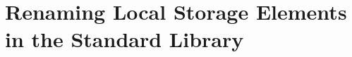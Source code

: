\FormallyParagraph
\begin{mathpar}
\end{mathpar}


\section{Renaming Local Storage Elements in the Standard Library\label{sec:Renaming Local Storage Elements in the Standard Library}}

